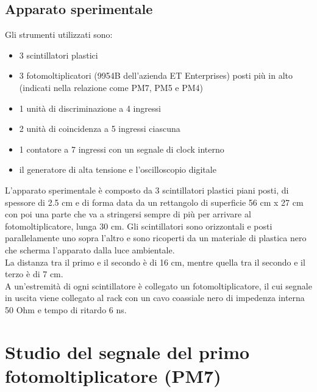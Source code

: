 \documentclass{article}
\begin{document}
\subsection{Apparato sperimentale}
Gli strumenti utilizzati sono: 
\begin{itemize}
    \item 3 scintillatori plastici 
    \item 3 fotomoltiplicatori (9954B dell'azienda ET Enterprises) posti più in alto (indicati nella relazione come PM7, PM5 e PM4) 
    \item 1 unità di discriminazione a 4 ingressi
    \item 2 unità di coincidenza a 5 ingressi ciascuna
    \item 1 contatore a 7 ingressi con un segnale di clock interno
    \item il generatore di alta tensione e l'oscilloscopio digitale
\end{itemize}
L'apparato sperimentale è composto da 3 scintillatori plastici piani posti, di spessore di 2.5 cm e di forma data da un rettangolo di superficie 56 cm x 27 cm con poi una parte che va a stringersi sempre di più per arrivare al fotomoltiplicatore, lunga 30 cm.
Gli scintillatori sono orizzontali e posti parallelamente uno sopra l'altro e sono ricoperti da un materiale di plastica nero che scherma l'apparato dalla luce ambientale. \\
La distanza tra il primo e il secondo è di 16 cm, mentre quella tra il secondo e il terzo è di 7 cm. \\
A un'estremità di ogni scintillatore è collegato un fotomoltiplicatore, il cui segnale in uscita viene collegato al rack con un cavo coassiale nero di impedenza interna 50 Ohm e tempo di ritardo 6 ns.\\

\newpage
\section{Studio del segnale del primo fotomoltiplicatore (PM7)}
\end{document}
